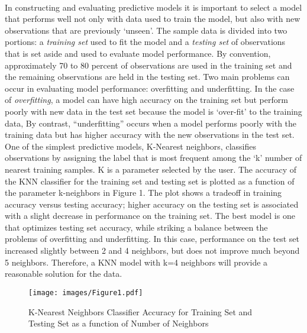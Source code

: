 \\\documentclass[sigconf]{acmart}
\begin{document}
In constructing and evaluating predictive models it is important to select 
a model that performs well not only with data used to train the model, but 
also with new observations that are previously `unseen'. The sample data
is divided into two portions: a \emph{training set} used to fit the model 
and a \emph{testing set} of observations that is set aside and used to 
evaluate model performance. By convention, approximately 70 to 80 percent of 
observations are used in the training set and the remaining observations 
are held in the testing set. Two main problems can occur in evaluating model 
performance: overfitting and underfitting. In the case of \emph{overfitting}, 
a model can have high accuracy on the training set but perform poorly with 
new data in the test set because the model is `over-fit' to the training data, 
By contrast, ``underfitting'' occurs when a model performs poorly with the 
training data but has higher accuracy with the new observations in the test 
set. One of the simplest predictive models, K-Nearest neighbors, classifies 
observations by assigning the label that is most frequent among the `k' number 
of nearest training samples. K is a parameter selected by the user. The 
accuracy of the KNN classifier for the training set and testing set is 
plotted as a function of the parameter k-neighbors in Figure 1. The plot 
shows a tradeoff in training accuracy versus testing accuracy; higher accuracy
on the testing set is associated with a slight decrease in performance on the
training set. The best model is one that optimizes testing set accuracy, 
while striking a balance between the problems of overfitting and underfitting.
In this case, performance on the test set increased slightly between 2 and 4 
neighbors, but does not improve much beyond 5 neighbors. Therefore, a KNN
model with k=4 neighbors will provide a reasonable solution for the data. 

 \begin{figure}[!ht]
  \centering\texttt{[image: images/Figure1.pdf]}
  \caption{K-Nearest Neighbors Classifier Accuracy for Training Set and 
  Testing Set as a function of Number of Neighbors}
  \label{f:Figure1}
\end{figure}



\end{document}
